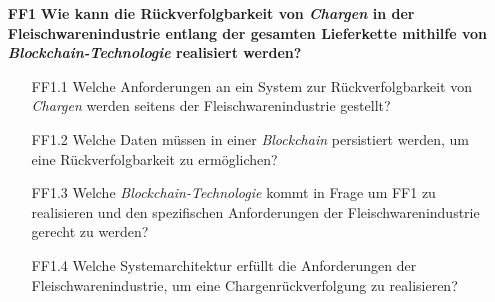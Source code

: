 \begin{itemize}
  \item[\textbf{FF1}] \textbf{Wie kann die Rückverfolgbarkeit von \textit{Chargen} in der Fleischwarenindustrie entlang der gesamten Lieferkette mithilfe von \textit{Blockchain-Technologie} realisiert werden?}
  \begin{itemize}
    \item[FF1.1] Welche Anforderungen an ein System zur Rückverfolgbarkeit von \textit{Chargen} werden seitens der Fleischwarenindustrie gestellt?
    \item[FF1.2] Welche Daten müssen in einer \textit{Blockchain} persistiert werden, um eine Rückverfolgbarkeit zu ermöglichen?
    \item[FF1.3] Welche \textit{Blockchain-Technologie} kommt in Frage um FF1 zu realisieren und den spezifischen Anforderungen der Fleischwarenindustrie gerecht zu werden?
    \item[FF1.4] Welche Systemarchitektur erfüllt die Anforderungen der Fleischwarenindustrie, um eine Chargenrückverfolgung zu realisieren?
  \end{itemize}
\end{itemize}


\newpage
